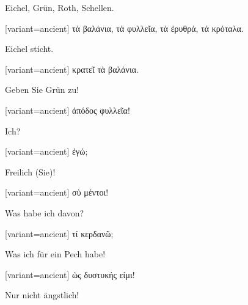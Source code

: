Eichel, Grün, Roth, Schellen.

\switchcolumn

\begin{greek}[variant=ancient]%
τὰ βαλάνια, τὰ φυλλεῖα, τὰ ἐρυθρά, τά κρόταλα.

\end{greek}%
\switchcolumn*

Eichel sticht.

\switchcolumn

\begin{greek}[variant=ancient]%
κρατεῖ τὰ βαλάνια.

\end{greek}%
\switchcolumn*

Geben Sie Grün zu!

\switchcolumn

\begin{greek}[variant=ancient]%
ἀπόδος φυλλεῖα!

\end{greek}%
\switchcolumn*

Ich?

\switchcolumn

\begin{greek}[variant=ancient]%
ἐγώ;

\end{greek}%
\switchcolumn*

Freilich (Sie)!

\switchcolumn

\begin{greek}[variant=ancient]%
σὺ μέντοι!

\end{greek}%
\switchcolumn*

Was habe ich davon?

\switchcolumn

\begin{greek}[variant=ancient]%
τί κερδανῶ;

\end{greek}%
\switchcolumn*

Was ich für ein Pech habe!

\switchcolumn

\begin{greek}[variant=ancient]%
ὡς δυστυκής εἰμι!

\end{greek}%
\switchcolumn*

Nur nicht ängstlich!

\switchcolumn

